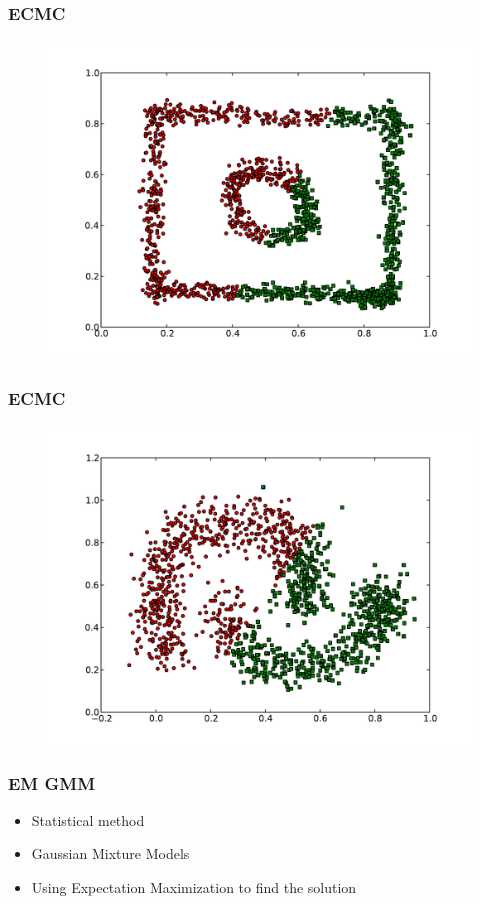 \documentclass{beamer}
\begin{document}
\begin{frame}
\frametitle{ECMC}
    \begin{figure}[]
    \includegraphics[scale=0.5]{ECMC_circle-weird.pdf}
    \end{figure}
\end{frame}

\begin{frame}
\frametitle{ECMC}
    \begin{figure}[]
    \includegraphics[scale=0.5]{ECMC_half-moons.pdf}
    \end{figure}
\end{frame}



\begin{frame}
\frametitle{EM GMM}
    \begin{itemize}
    	\item Statistical method
   	\item Gaussian Mixture Models
   	\item Using Expectation Maximization to find the solution
    \end{itemize}
\end{frame}
\end{document}
